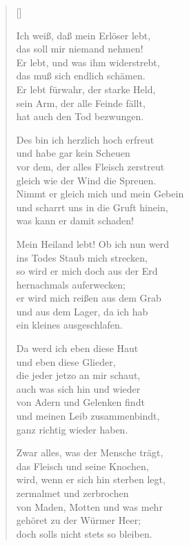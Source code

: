 \begin{multicols}{2}
\settowidth{\versewidth}{Mein Heiland lebt! Ob ich nun werd}
\begin{verse}[\versewidth]

 Ich weiß, daß mein Erlöser lebt,\\
das soll mir niemand nehmen!\\
Er lebt, und was ihm widerstrebt,\\
das muß sich endlich schämen.\\
Er lebt fürwahr, der starke Held,\\
sein Arm, der alle Feinde fällt,\\
hat auch den Tod bezwungen.

 Des bin ich herzlich hoch erfreut\\
und habe gar kein Scheuen\\
vor dem, der alles Fleisch zerstreut\\
gleich wie der Wind die Spreuen.\\
Nimmt er gleich mich und mein Gebein\\
und scharrt uns in die Gruft hinein,\\
was kann er damit schaden!

 Mein Heiland lebt! Ob ich nun werd\\
ins Todes Staub mich strecken,\\
so wird er mich doch aus der Erd\\
hernachmals auferwecken;\\
er wird mich reißen aus dem Grab\\
und aus dem Lager, da ich hab\\
ein kleines ausgeschlafen.

 Da werd ich eben diese Haut\\
und eben diese Glieder,\\
die jeder jetzo an mir schaut,\\
auch was sich hin und wieder\\
von Adern und Gelenken findt\\
und meinen Leib zusammenbindt,\\
ganz richtig wieder haben.

 Zwar alles, was der Mensche trägt,\\
das Fleisch und seine Knochen,\\
wird, wenn er sich hin sterben legt,\\
zermalmet und zerbrochen\\
von Maden, Motten und was mehr\\
gehöret zu der Würmer Heer;\\
doch solls nicht stets so bleiben.


\end{verse}
\end{multicols}
